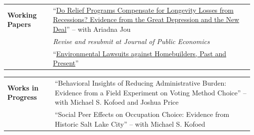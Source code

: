 \documentclass[11pt]{article}
\newcommand*{\tabindent}{ \hspace{0.75cm}} %
\begin{document}
    \vspace{0.4cm}


    \noindent
    \begin{tabularx}{\textwidth}{@{} p{3.75cm} >{\RaggedRight \arraybackslash}X @{}}
        \textbf{Working Papers} 
        & ``\href{https://ariadnajou.github.io/website/Jou_Morgan_102025.pdf}{Do Relief Programs Compensate for Longevity Losses from Recessions? Evidence from the Great Depression and the New Deal}'' -- with Ariadna Jou \\
        & \tabindent \textit{Revise and resubmit at Journal of Public Economics}\\[6pt]

        & ``\href{http://tommymorgan.net/research/sepa_permits_wp.pdf}{Environmental Lawsuits against Homebuilders, Past and Present}'' \\
    \end{tabularx}

    \vspace{0.4cm}


    \noindent
    \begin{tabularx}{\textwidth}{@{} p{3.75cm} >{\RaggedRight \arraybackslash}X @{}}
        \textbf{Works in Progress} 
        & ``Behavioral Insights of Reducing Administrative Burden: Evidence from a Field Experiment on Voting Method Choice'' -- with Michael S. Kofoed and Joshua Price \\[17pt]

        & ``Social Peer Effects on Occupation Choice: Evidence from Historic Salt Lake City'' -- with Michael S. Kofoed \\
    \end{tabularx}

    \vspace{0.4cm}
\end{document}
